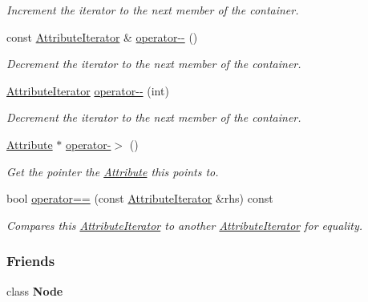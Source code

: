 \begin{DoxyCompactItemize}
\begin{DoxyCompactList}\small\item\em Increment the iterator to the next member of the container. \item\end{DoxyCompactList}\item 
const \hyperlink{classMezzanine_1_1xml_1_1AttributeIterator}{AttributeIterator} \& \hyperlink{classMezzanine_1_1xml_1_1AttributeIterator_a3a4742f7e9e99e970a20aa1b4dc605eb}{operator-\/-\/} ()
\begin{DoxyCompactList}\small\item\em Decrement the iterator to the next member of the container. \item\end{DoxyCompactList}\item 
\hyperlink{classMezzanine_1_1xml_1_1AttributeIterator}{AttributeIterator} \hyperlink{classMezzanine_1_1xml_1_1AttributeIterator_a2107b436e01525633c303af77a11b52e}{operator-\/-\/} (int)
\begin{DoxyCompactList}\small\item\em Decrement the iterator to the next member of the container. \item\end{DoxyCompactList}\item 
\hyperlink{classMezzanine_1_1xml_1_1Attribute}{Attribute} $\ast$ \hyperlink{classMezzanine_1_1xml_1_1AttributeIterator_a285be67641122fe833d89003c0c69d84}{operator-\/$>$} ()
\begin{DoxyCompactList}\small\item\em Get the pointer the \hyperlink{classMezzanine_1_1xml_1_1Attribute}{Attribute} this points to. \item\end{DoxyCompactList}\item 
bool \hyperlink{classMezzanine_1_1xml_1_1AttributeIterator_aaecab8d0301b11a97a2466e2f26b1ac1}{operator==} (const \hyperlink{classMezzanine_1_1xml_1_1AttributeIterator}{AttributeIterator} \&rhs) const 
\begin{DoxyCompactList}\small\item\em Compares this \hyperlink{classMezzanine_1_1xml_1_1AttributeIterator}{AttributeIterator} to another \hyperlink{classMezzanine_1_1xml_1_1AttributeIterator}{AttributeIterator} for equality. \item\end{DoxyCompactList}\end{DoxyCompactItemize}
\subsubsection*{Friends}
\begin{DoxyCompactItemize}
\item 
\hypertarget{classMezzanine_1_1xml_1_1AttributeIterator_a6db9d28bd448a131448276ee03de1e6d}{
class {\bfseries Node}}
\label{classMezzanine_1_1xml_1_1AttributeIterator_a6db9d28bd448a131448276ee03de1e6d}

\end{DoxyCompactItemize}


